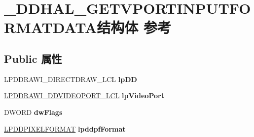 \hypertarget{struct___d_d_h_a_l___g_e_t_v_p_o_r_t_i_n_p_u_t_f_o_r_m_a_t_d_a_t_a}{}\section{\+\_\+\+D\+D\+H\+A\+L\+\_\+\+G\+E\+T\+V\+P\+O\+R\+T\+I\+N\+P\+U\+T\+F\+O\+R\+M\+A\+T\+D\+A\+T\+A结构体 参考}
\label{struct___d_d_h_a_l___g_e_t_v_p_o_r_t_i_n_p_u_t_f_o_r_m_a_t_d_a_t_a}
\subsection*{Public 属性}
\begin{DoxyCompactItemize}
\item 
\mbox{\label{struct___d_d_h_a_l___g_e_t_v_p_o_r_t_i_n_p_u_t_f_o_r_m_a_t_d_a_t_a_a906cd46921b3bcc5862489862103cf54}} 
L\+P\+D\+D\+R\+A\+W\+I\+\_\+\+D\+I\+R\+E\+C\+T\+D\+R\+A\+W\+\_\+\+L\+CL {\bfseries lp\+DD}
\item 
\mbox{\label{struct___d_d_h_a_l___g_e_t_v_p_o_r_t_i_n_p_u_t_f_o_r_m_a_t_d_a_t_a_ac26b417fb004fdfa68176c1af6dcea63}} 
\hyperlink{struct___d_d_r_a_w_i___d_d_v_i_d_e_o_p_o_r_t___l_c_l}{L\+P\+D\+D\+R\+A\+W\+I\+\_\+\+D\+D\+V\+I\+D\+E\+O\+P\+O\+R\+T\+\_\+\+L\+CL} {\bfseries lp\+Video\+Port}
\item 
\mbox{\label{struct___d_d_h_a_l___g_e_t_v_p_o_r_t_i_n_p_u_t_f_o_r_m_a_t_d_a_t_a_ab2d038fa358f67fc6bee8840dbfd04ca}} 
D\+W\+O\+RD {\bfseries dw\+Flags}
\item 
\mbox{\label{struct___d_d_h_a_l___g_e_t_v_p_o_r_t_i_n_p_u_t_f_o_r_m_a_t_d_a_t_a_a1d1b848a8986692c7c4bd8d4ecb61daa}} 
\hyperlink{interfacevoid}{L\+P\+D\+D\+P\+I\+X\+E\+L\+F\+O\+R\+M\+AT} {\bfseries lpddpf\+Format}
\item 
\mbox{\label{struct___d_d_h_a_l___g_e_t_v_p_o_r_t_i_n_p_u_t_f_o_r_m_a_t_d_a_t_a_a2caec663ff50064749522cb2bde214fb}} 

\end{DoxyCompactItemize}
